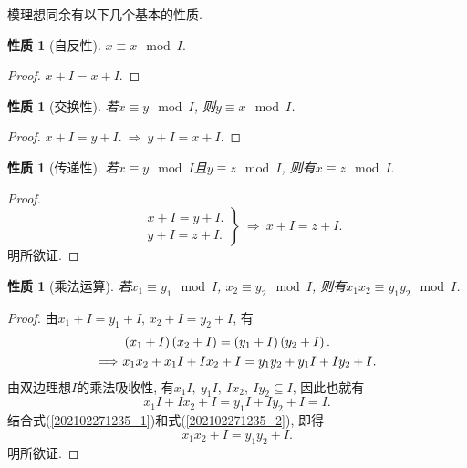 \documentclass[UTF8, twoside]{ctexart}
\theoremstyle{nonumberplain}
\newtheorem{proof}{\heiti 证明}  %
\theoremstyle{nonumberplain}
\theoremstyle{plain}
\newtheorem{xingzhi4}[dingyi4]{性质}
\begin{document}
	模理想同余有以下几个基本的性质.
	\begin{xingzhi4}[自反性]
		$x\equiv x\ \bmod I.$
	\end{xingzhi4}
	\begin{proof}
		$x+I=x+I$.
	\end{proof}
	\begin{xingzhi4}[交换性]
		若$x\equiv y\ \bmod I$, 则$y\equiv x
		\ \bmod I$.
	\end{xingzhi4}
	\begin{proof}
		$x+I=y+I.\ \Rightarrow \ y+I=x+I.$
	\end{proof}
	\begin{xingzhi4}[传递性]
		若$x\equiv y\ \bmod I$且$y\equiv z\ \bmod I$, 则有$x\equiv z\ \bmod I.$
	\end{xingzhi4}
	\begin{proof}
		\[\left. \begin{aligned}
			& x+I=y+I. \\ 
			& y+I=z+I.
		\end{aligned} \right\}
	\ \Longrightarrow \ 
	x+I=z+I.\]
	明所欲证.
	\end{proof}
	\begin{xingzhi4}[乘法运算] \label{乘法运算性质}
		若${{x}_{1}}\equiv {{y}_{1}}\ \bmod I$, ${{x}_{2}}\equiv {{y}_{2}}\ \bmod I$, 则有${{x}_{1}}{{x}_{2}}\equiv {{y}_{1}}{{y}_{2}}\ \bmod I$.
	\end{xingzhi4}
	\begin{proof}
		由${{x}_{1}}+I={{y}_{1}}+I$, ${{x}_{2}}+I={{y}_{2}}+I$, 有
		\begin{align}
			& \left( {{x}_{1}}+I \right)\left( {{x}_{2}}+I \right)=\left( {{y}_{1}}+I \right)\left( {{y}_{2}}+I \right).\notag \\ 
			\Longrightarrow\ & {{x}_{1}}{{x}_{2}}+{{x}_{1}}I+I{{x}_{2}}+I={{y}_{1}}{{y}_{2}}+{{y}_{1}}I+I{{y}_{2}}+I. 
			\label{202102271235_1}
		\end{align}
		由双边理想$I$的乘法吸收性, 有${{x}_{1}}I,\ {{y}_{1}}I,\ I{{x}_{2}},\ I{{y}_{2}}\subseteq I$, 因此也就有
		\begin{equation} \label{202102271235_2}
		{{x}_{1}}I+I{{x}_{2}}+I={{y}_{1}}I+I{{y}_{2}}+I=I.
		\end{equation}
		结合式(\ref{202102271235_1})和式(\ref{202102271235_2}), 即得
		\[
			{{x}_{1}}{{x}_{2}}+I={{y}_{1}}{{y}_{2}}+I.
		\]
		明所欲证.
	\end{proof}
	\vskip 0.5cm
	
\end{document}
